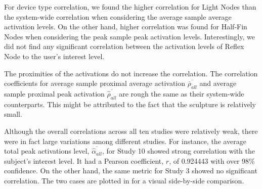 For device type correlation, we found the higher correlation for Light Nodes than the system-wide correlation when considering the average sample average activation levels. On the other hand, higher correlation was found for Half-Fin Nodes when considering the peak sample peak activation levels. Interestingly, we did not find any significant correlation between the activation levels of Reflex Node to the user's interest level. 

The proximities of the activations do not increase the correlation. The correlation coefficients for average sample proximal average activation $\overline{\overline{\rho}_{all}}$ and average sample proximal peak activation $\overline{\widehat{\rho}_{all}}$ are rough the same as their system-wide counterparts. This might be attributed to the fact that the sculpture is relatively small. 

Although the overall correlations across all ten studies were relatively weak, there were in fact large variations among different studies. For instance, the average total peak activations level, $\overline{\widehat{\alpha}_{all}}$, for Study 10 showed strong correlation with the subject's interest level. It had a Pearson coefficient, $r$, of 0.924443 with over 98\% confidence. On the other hand, the same metric for Study 3 showed no significant correlation. The two cases are plotted in  for a visual side-by-side comparison.



